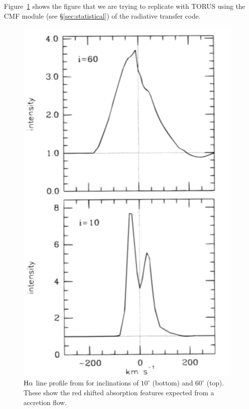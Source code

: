 \documentclass[fleqn,usenatbib]{mnras}
\begin{document}
Figure~\ref{fig:muzerolle} shows the figure that we are trying to replicate with TORUS using the CMF module (see \S\ref{sec:statistical}) of the radiative transfer code. 
\begin{figure}
    \centering
    \includegraphics[width=\linewidth]{figures/muz}
    \caption{${\rm H}\alpha$ line profile from \citet{1998ApJ...492..743M} for inclinations of $10^{\circ}$  (bottom) and $60^{\circ}$ (top). These show the red shifted absorption features expected from a accretion flow.}
    \label{fig:muzerolle}
\end{figure}
\end{document}
